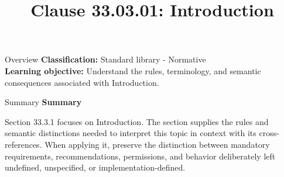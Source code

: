 \documentclass[10pt,letterpaper]{article}
\title{Clause 33.03.01: Introduction}
\author{}
\date{}
\begin{document}
\maketitle
\begin{CornellOverviewBox}{Overview}
\textbf{Classification:} Standard library - Normative\\[2pt]
\textbf{Learning objective:} Understand the rules, terminology, and semantic consequences associated with Introduction.
\end{CornellOverviewBox}\begin{CornellSummaryBox}{Summary}
{\sffamily\bfseries\color{Accent} Summary}\par\vspace{3pt}Section 33.3.1 focuses on Introduction. The section supplies the rules and semantic distinctions needed to interpret this topic in context with its cross-references. When applying it, preserve the distinction between mandatory requirements, recommendations, permissions, and behavior deliberately left undefined, unspecified, or implementation-defined.
\end{CornellSummaryBox}
\end{document}
